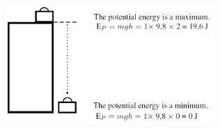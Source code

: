     \setcounter{subfigure}{0}


	\begin{figure}[H] %
    \begin{center}
    \label{m38784*id66304!!!underscore!!!media}\label{m38784*id66304!!!underscore!!!printimage}\includegraphics[width=300px]{col11305.imgs/m38784_PG10C3_007.png} %
        
      \vspace{2pt}
    \vspace{.1in}
    
    \end{center}

 \end{figure}   

    \addtocounter{footnote}{-0}
    
      \par 
\label{m38784*secfhsst!!!underscore!!!id939}\vspace{.5cm} 
      
